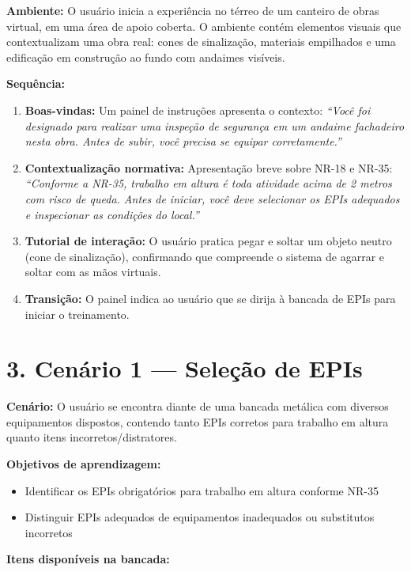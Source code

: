 \textbf{Ambiente:} O usuário inicia a experiência no térreo de um canteiro de obras virtual, em uma área de apoio coberta. O ambiente contém elementos visuais que contextualizam uma obra real: cones de sinalização, materiais empilhados e uma edificação em construção ao fundo com andaimes visíveis.

\textbf{Sequência:}

\begin{enumerate}
    \item \textbf{Boas-vindas:} Um painel de instruções apresenta o contexto: \textit{``Você foi designado para realizar uma inspeção de segurança em um andaime fachadeiro nesta obra. Antes de subir, você precisa se equipar corretamente.''}
    \item \textbf{Contextualização normativa:} Apresentação breve sobre NR-18 e NR-35: \textit{``Conforme a NR-35, trabalho em altura é toda atividade acima de 2 metros com risco de queda. Antes de iniciar, você deve selecionar os EPIs adequados e inspecionar as condições do local.''}
    \item \textbf{Tutorial de interação:} O usuário pratica pegar e soltar um objeto neutro (cone de sinalização), confirmando que compreende o sistema de agarrar e soltar com as mãos virtuais.
    \item \textbf{Transição:} O painel indica ao usuário que se dirija à bancada de EPIs para iniciar o treinamento.
\end{enumerate}

\section*{3. Cenário 1 --- Seleção de EPIs}

\textbf{Cenário:} O usuário se encontra diante de uma bancada metálica com diversos equipamentos dispostos, contendo tanto EPIs corretos para trabalho em altura quanto itens incorretos/distratores.

\textbf{Objetivos de aprendizagem:}

\begin{itemize}
    \item Identificar os EPIs obrigatórios para trabalho em altura conforme NR-35
    \item Distinguir EPIs adequados de equipamentos inadequados ou substitutos incorretos
\end{itemize}

\textbf{Itens disponíveis na bancada:}

